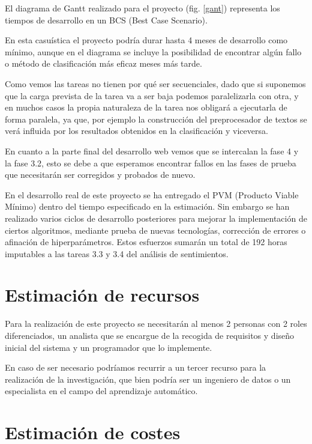 El diagrama de Gantt realizado para el proyecto (fig. \ref{gant}) representa los tiempos de desarrollo en un BCS (Best Case Scenario).

En esta casuística el proyecto podría durar hasta 4 meses de desarrollo como mínimo, aunque en el diagrama se incluye la posibilidad de encontrar algún fallo o método de clasificación más eficaz meses más tarde.

Como vemos las tareas no tienen por qué ser secuenciales, dado que si suponemos que la carga prevista de la tarea va a ser baja podemos paralelizarla con otra, y en muchos casos la propia naturaleza de la tarea nos obligará a ejecutarla de forma paralela, ya que, por ejemplo la construcción del preprocesador de textos se verá influida por los resultados obtenidos en la clasificación y viceversa.

En cuanto a la parte final del desarrollo web vemos que se intercalan la fase 4 y la fase 3.2, esto se debe a que esperamos encontrar fallos en las fases de prueba que necesitarán ser corregidos y probados de nuevo.

En el desarrollo real de este proyecto se ha entregado el PVM (Producto Viable Mínimo) dentro del tiempo especificado en la estimación. Sin embargo se han realizado varios ciclos de desarrollo posteriores para mejorar la implementación de ciertos algoritmos, mediante prueba de nuevas tecnologías, corrección de errores o afinación de hiperparámetros. Estos esfuerzos sumarán un total de 192 horas imputables a las tareas 3.3 y 3.4 del análisis de sentimientos.

\section{Estimación de recursos}

Para la realización de este proyecto se necesitarán al menos 2 personas con 2 roles diferenciados, un analista que se encargue de la recogida de requisitos y diseño inicial del sistema y un programador que lo implemente.

En caso de ser necesario podríamos recurrir a un tercer recurso para la realización de la investigación, que bien podría ser un ingeniero de datos o un especialista en el campo del aprendizaje automático.

\section{Estimación de costes}

